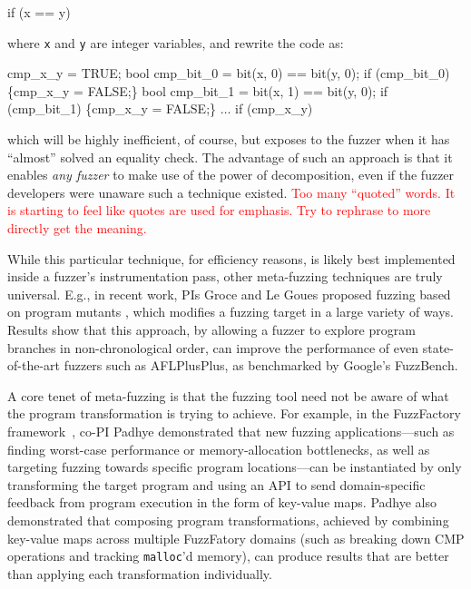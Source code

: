 \documentclass[numbers]{proposalnsf}
\newcommand{\jdh}[1]{\textcolor{red}{#1}}
\begin{document}
\begin{code}

if (x == y)
\end{code}

\noindent where {\tt x} and {\tt y} are integer variables, and rewrite the code as:

\begin{code}
cmp\_x\_y = TRUE;
bool cmp\_bit\_0 = bit(x, 0) == bit(y, 0);
if (cmp\_bit\_0) \{cmp\_x\_y = FALSE;\}
bool cmp\_bit\_1 = bit(x, 1) == bit(y, 0);
if (cmp\_bit\_1) \{cmp\_x\_y = FALSE;\}
$\ldots$
if (cmp\_x\_y)
\end{code}

\noindent which will be highly inefficient, of course, but exposes to the fuzzer when it has ``almost'' solved an equality check.  The advantage of such an approach is that it enables \emph{any fuzzer} to make use of the power of decomposition, even if the fuzzer developers were unaware such a technique existed. \jdh{Too many ``quoted'' words.  It is starting to feel like quotes are used for emphasis.  Try to rephrase to more directly get the meaning.}

While this particular technique, for efficiency reasons, is likely best implemented inside a fuzzer's instrumentation pass, other meta-fuzzing techniques are truly universal.  E.g., in recent work, PIs Groce and Le Goues proposed fuzzing based on program mutants \cite{}, which modifies a fuzzing target in a large variety of ways.  Results show that this approach, by allowing a fuzzer to explore program branches in non-chronological order, can improve the performance of even state-of-the-art fuzzers such as AFLPlusPlus, as benchmarked by Google's FuzzBench.

A core tenet of meta-fuzzing is that the fuzzing tool need not be aware of what the program transformation is trying to achieve. For example, in the FuzzFactory framework~\cite{fuzzfactory}, co-PI Padhye demonstrated that new fuzzing applications---such as finding worst-case performance or memory-allocation bottlenecks, as well as targeting fuzzing towards specific program locations---can be instantiated by only transforming the target program and using an API to send domain-specific feedback from program execution in the form of key-value maps. Padhye also demonstrated that composing program transformations, achieved by combining key-value maps across multiple FuzzFatory domains (such as breaking down CMP operations and tracking \texttt{malloc}'d memory), can produce results that are better than applying each transformation individually.
\end{document}

